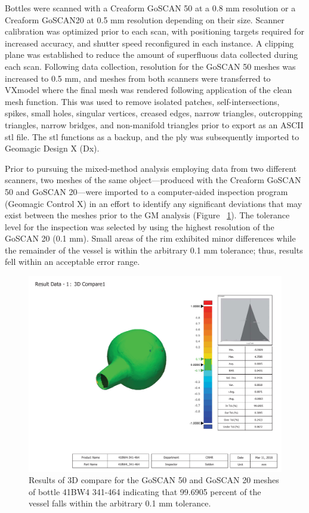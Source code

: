 \documentclass[article]{sa}
\begin{document}
Bottles were scanned with a Creaform GoSCAN 50 at a 0.8 mm resolution or a Creaform GoSCAN20 at 0.5 mm resolution depending on their size. Scanner calibration was optimized prior to each scan, with positioning targets required for increased accuracy, and shutter speed reconfigured in each instance. A clipping plane was established to reduce the amount of superfluous data collected during each scan. Following data collection, resolution for the GoSCAN 50 meshes was increased to 0.5 mm, and meshes from both scanners were transferred to VXmodel where the final mesh was rendered following application of the clean mesh function. This was used to remove isolated patches, self-intersections, spikes, small holes, singular vertices, creased edges, narrow triangles, outcropping triangles, narrow bridges, and non-manifold triangles prior to export as an ASCII stl file. The stl functions as a backup, and the ply was subsequently imported to Geomagic Design X (Dx).

Prior to pursuing the mixed-method analysis employing data from two different scanners, two meshes of the same object---produced with the Creaform GoSCAN 50 and GoSCAN 20---were imported to a computer-aided inspection program (Geomagic Control X) in an effort to identify any significant deviations that may exist between the meshes prior to the GM analysis (Figure ~\ref{fig:fig3}). The tolerance level for the inspection was selected by using the highest resolution of the GoSCAN 20 (0.1 mm). Small areas of the rim exhibited minor differences while the remainder of the vessel is within the arbitrary 0.1 mm tolerance; thus, results fell within an acceptable error range.

\begin{figure}[htbp]\centering
\includegraphics[width=\linewidth]{Figure_03}
\caption{Results of 3D compare for the GoSCAN 50 and GoSCAN 20 meshes of bottle 41BW4 341-464 indicating that 99.6905 percent of the vessel falls within the arbitrary 0.1 mm tolerance.}
\label{fig:fig3}
\end{figure}
\end{document}

